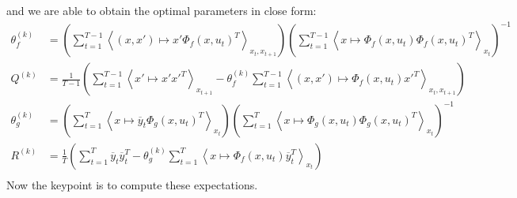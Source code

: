 and we are able to obtain the optimal parameters in close form:
\begin{align*}
  \theta_f^{(k)} &=
    \left(
      \sum_{t=1}^{T-1}{\left< (x,x') \mapsto x' \Phi_f(x,u_t)^T \right>_{x_t,x_{t+1}}}
    \right)
    \left(
      \sum_{t=1}^{T-1}{\left< x \mapsto \Phi_f(x, u_t)\Phi_f(x,u_t)^T \right>_{x_t}}
    \right)^{-1}
  \\
  Q^{(k)} &=
    \frac{1}{T-1}
    \left(
      \sum_{t=1}^{T-1}{\left< x' \mapsto x'x'^T \right>_{x_{t+1}}} -
      \theta_f^{(k)} \sum_{t=1}^{T-1}{\left< (x,x') \mapsto \Phi_f(x, u_t) x'^T \right>_{x_t,x_{t+1}}}
    \right)
  \\
  \theta_g^{(k)} &=
    \left(
      \sum_{t=1}^{T}{\left< x \mapsto \overline{y}_{t}\Phi_g(x,u_t)^T \right>_{x_t}}
    \right)
    \left(
      \sum_{t=1}^{T}{\left< x \mapsto \Phi_g(x,u_t)\Phi_g(x,u_t)^T \right>_{x_t}}
    \right)^{-1}
  \\
  R^{(k)} &=
    \frac{1}{T}
    \left(
      \sum_{t=1}^{T}{\overline{y}_t \overline{y}_t^T} -
      \theta_g^{(k)} \sum_{t=1}^{T}{\left< x \mapsto \Phi_f(x, u_t) \overline{y}_t^T \right>_{x_t}}
    \right)
  \\
\end{align*}
Now the keypoint is to compute these expectations.

